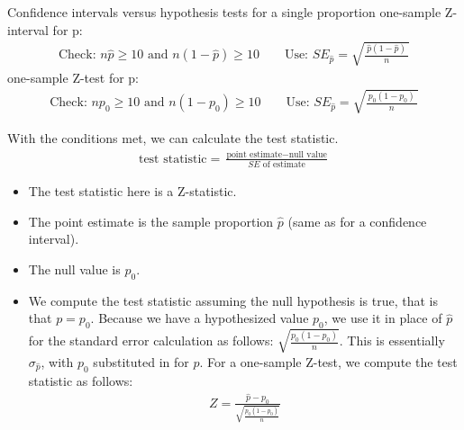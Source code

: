 \begin{onebox}{Confidence intervals versus hypothesis tests for a single proportion}
one-sample Z-interval for p:
\begin{align*}
\text{Check:  } n\hat{p}\ge 10 \text{ and }n(1-\hat{p})\ge 10 \qquad \text{Use:  }SE_{\hat{p}} = \sqrt{\frac{\ \hat{p}(1-\hat{p})\ }{n}}
\end{align*}
one-sample Z-test for p:
\begin{align*}
\text{Check:  } np_0\ge 10 \text{ and } n(1-p_0)\ge 10 \qquad \text{Use:  }SE_{\hat{p}} = \sqrt{\frac{\ p_0(1-p_0)\ }{n}}
\end{align*}
\end{onebox}


With the conditions met, we can calculate the test statistic. 
\begin{align*}
\text{test statistic} = \frac{\text{point estimate} - \text{null value}}{SE \text{ of estimate}}
\end{align*}
\begin{itemize}
\item The test statistic here is a Z-statistic.
\item The point estimate is the sample proportion $\hat{p}$ (same as for a confidence interval).
\item The null value is $p_0$.
\item We compute the test statistic assuming the null hypothesis is true, that is that $p = p_0$.  Because we have a hypothesized value $p_0$, we use it in place of $\hat{p}$ for the standard error calculation as follows: $\sqrt{\frac{p_0(1-p_0)}{n}}$.  This is essentially $\sigma_{\hat{p}}$, with $p_0$ substituted in for $p$.  For a one-sample Z-test, we compute the test statistic as follows:
\begin{align*}
Z = \frac{\hat{p} - p_0}{\sqrt{\frac{p_0(1-p_0)}{n}}}
\end{align*}
\end{itemize}

